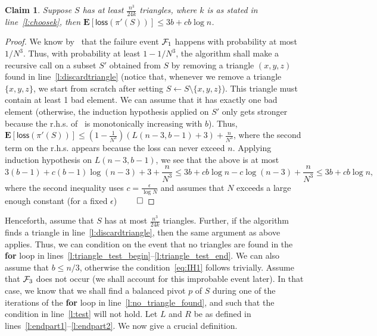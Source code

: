 \documentclass[11pt]{llncs}
\newtheorem{clm}[theorem]{Claim}
\newcommand{\E}{\mathbf{E}}
\newcommand{\loss}{{\textsf{loss}}}
\begin{document}
\begin{clm}
    \label{cl:trianglecase}
    Suppose $S$ has at least $\frac{n^3}{24k}$ triangles, where $k$ is as stated in line~\ref{l:choosek}, then $\E[\loss(\pi'(S))] \leq 3b + cb \log n$.
\end{clm}
\begin{proof}
    We know by~ that the failure event ${\cal F}_1$ happens with probability at most $1/N^3$. Thus, with probability at least $1-1/N^3$, the algorithm shall make a recursive call on a subset $S'$ obtained from $S$ by removing a triangle $(x,y,z)$ found in line~\ref{l:discardtriangle} (notice that, whenever we remove a triangle $\{x, y, z\}$, we start from scratch after setting $S \gets S \setminus \{x, y, z\}$). This triangle must contain at least 1 bad element. We can assume that it has exactly one bad element (otherwise, the induction hypothesis applied on $S'$ only gets stronger because the r.h.s. of~ is monotonically increasing with $b$). Thus, 
    $\E[\loss(\pi'(S))] \leq \left(1 - \frac{1}{N^3} \right) (L(n-3,b-1) + 3) + \frac{n}{N^3}$,
    where the second term on the r.h.s. appears because the loss can never exceed $n$. Applying induction hypothesis on $L(n-3, b-1)$, we see that the above is at most 
    $$3(b-1) + c(b-1)\log(n-3) + 3 + \frac{n}{N^3} \leq 3b + cb \log n - c \log (n-3) + \frac{n}{N^3} \leq 3b + cb \log n,$$
    where the second inequality uses $c = \frac{\epsilon}{\log N}$ and assumes that $N$ exceeds a large enough constant (for a fixed $\epsilon$) $\qed$ 
\end{proof}
Henceforth, assume that $S$ has at most $\frac{n^3}{24k}$ triangles. Further, if the algorithm finds a triangle in line~\ref{l:discardtriangle}, then the same argument as above applies. Thus, we can condition on the event that no triangles are found in the {\bf for} loop in lines~\ref{l:triangle_test_begin}--\ref{l:triangle_test_end}. We can also assume that $b \leq n/3$, otherwise the condition~\eqref{eq:IH1} follows trivially. Assume that ${\cal F}_3$ does not occur (we shall account for this improbable event later). In that case, we know that we shall find a balanced pivot $p$ of $S$ during one of the iterations of the {\bf for} loop in line~\ref{l:no_triangle_found}, and such that the condition in line~\ref{l:test} will not hold.
Let $L$ and $R$ be as defined in lines~\ref{l:endpart1}--\ref{l:endpart2}. We now give a crucial definition. 
\end{document}
